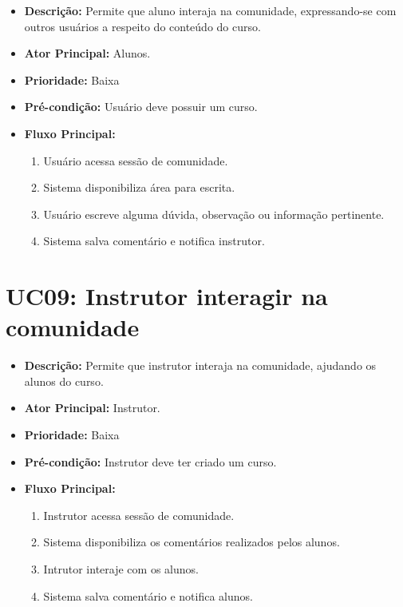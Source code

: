        \begin{itemize}
            \item \textbf{Descrição:} Permite que aluno interaja na comunidade, expressando-se com outros usuários a respeito do conteúdo do curso.
            
            \item \textbf{Ator Principal:} Alunos.
            
            \item \textbf{Prioridade:} Baixa
            
            \item \textbf{Pré-condição:} Usuário deve possuir um curso.
            
            \item \textbf{Fluxo Principal:}
            \begin{enumerate}
                \item Usuário acessa sessão de comunidade.
                \item Sistema disponibiliza área para escrita.
                \item Usuário escreve alguma dúvida, observação ou informação pertinente.
                \item Sistema salva comentário e notifica instrutor.
            \end{enumerate}
        \end{itemize}

        \section*{UC09: Instrutor interagir na comunidade}

        \begin{itemize}
            \item \textbf{Descrição:} Permite que instrutor interaja na comunidade, ajudando os alunos do curso.
            
            \item \textbf{Ator Principal:} Instrutor.
            
            \item \textbf{Prioridade:} Baixa
            
            \item \textbf{Pré-condição:} Instrutor deve ter criado um curso.
            
            \item \textbf{Fluxo Principal:}
            \begin{enumerate}
                \item Instrutor acessa sessão de comunidade.
                \item Sistema disponibiliza os comentários realizados pelos alunos.
                \item Intrutor interaje com os alunos.
                \item Sistema salva comentário e notifica alunos.
            \end{enumerate}
        \end{itemize}


